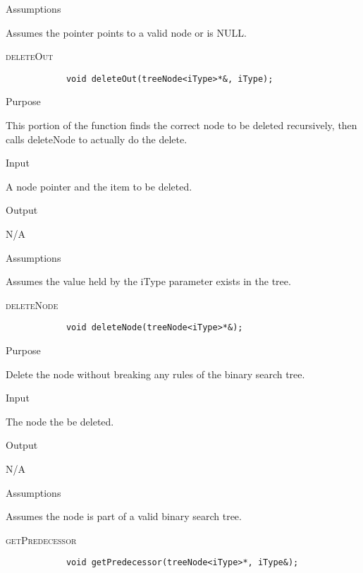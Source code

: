 \documentclass[pdftex, 12pt]{article}
\begin{document}
\begin{description}
\begin{description}
			\item{Assumptions}

				Assumes the pointer points to a valid node or is NULL.

		\end{description}
	\item{\textsc{deleteOut}}
		\begin{lstlisting}
			void deleteOut(treeNode<iType>*&, iType);
		\end{lstlisting}
		\begin{description}

			\item{Purpose}

				This portion of the function finds the correct node to be deleted recursively, then calls deleteNode to
				actually do the delete.

			\item{Input}

				A node pointer and the item to be deleted.

			\item{Output}

				N/A

			\item{Assumptions}

				Assumes the value held by the iType parameter exists in the tree.

		\end{description}
	\item{\textsc{deleteNode}}
		\begin{lstlisting}
			void deleteNode(treeNode<iType>*&);
		\end{lstlisting}
		\begin{description}

			\item{Purpose}

				Delete the node without breaking any rules of the binary search tree.

			\item{Input}

				The node the be deleted.

			\item{Output}

				N/A

			\item{Assumptions}

				Assumes the node is part of a valid binary search tree.

		\end{description}
	\item{\textsc{getPredecessor}}
		\begin{lstlisting}
			void getPredecessor(treeNode<iType>*, iType&);
		\end{lstlisting}
		\begin{description}


\end{description}
\end{description}
\end{document}
